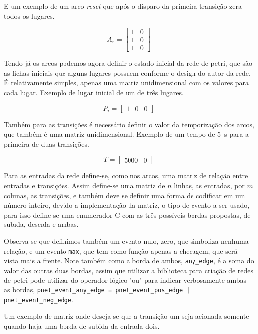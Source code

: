 E um exemplo de um arco \textit{reset} que após o disparo da primeira transição zera todos os lugares.

$$ A_r =
\begin{bmatrix}
	 1 & 0\\
	 1 & 0\\
	 1 & 0
\end{bmatrix}
$$

Tendo já os arcos podemos agora definir o estado inicial da rede de petri, que são as fichas iniciais que alguns lugares possuem conforme o design do autor da rede. É relativamente simples, apenas uma matriz unidimensional com os valores para cada lugar. Exemplo de lugar inicial de um de três lugares.

$$
P_i = 
\begin{bmatrix}
	 1 & 0 & 0
\end{bmatrix}
$$

Também para as transições é necessário definir o valor da temporização dos arcos, que também é uma matriz unidimensional. Exemplo de um tempo de \SI{5}{s} para a primeira de duas transições.

$$
T = 
\begin{bmatrix}
	 5000 & 0
\end{bmatrix}
$$

Para as entradas da rede define-se, como nos arcos, uma matriz de relação entre entradas e transições. Assim define-se uma matriz de $n$ linhas, as entradas, por $m$ colunas, as transições, e também deve se definir uma forma de codificar em um número inteiro, devido a implementação da matriz, o tipo de evento a ser usado, para isso define-se uma enumerador C com as três possíveis bordas propostas, de subida, descida e ambas.



Observa-se que definimos também um evento nulo, zero, que simboliza nenhuma relação, e um evento \lstinline{max}, que tem como função apenas a checagem, que será vista mais a frente. Note também como a borda de ambos, \lstinline{any_edge}, é a soma do valor das outras duas bordas, assim que utilizar a biblioteca para criação de redes de petri pode utilizar do operador lógico "ou" para indicar verbosamente ambas as bordas, \lstinline{pnet_event_any_edge = pnet_event_pos_edge | pnet_event_neg_edge}.

Um exemplo de matriz onde deseja-se que a transição um seja acionada somente quando haja uma borda de subida da entrada dois.

